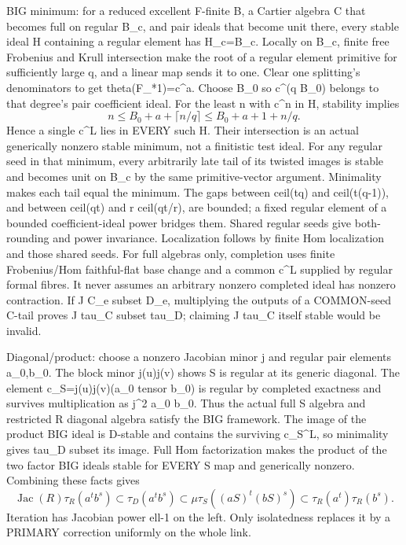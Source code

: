 \documentclass[11pt]{article}
\begin{document}
BIG minimum: for a reduced excellent F-finite B, a Cartier algebra C that becomes full on regular B\_c, and pair ideals that become unit there, every stable ideal H containing a regular element has H\_c=B\_c. Locally on B\_c, finite free Frobenius and Krull intersection make the root of a regular element primitive for sufficiently large q, and a linear map sends it to one. Clear one splitting's denominators to get theta(F\_*1)=c\textasciicircum{}a. Choose B\_0 so c\textasciicircum{}(q B\_0) belongs to that degree's pair coefficient ideal. For the least n with c\textasciicircum{}n in H, stability implies
\[
 n\le B_0+a+\lceil n/q\rceil\le B_0+a+1+n/q.
\]
Hence a single c\textasciicircum{}L lies in EVERY such H. Their intersection is an actual generically nonzero stable minimum, not a finitistic test ideal. For any regular seed in that minimum, every arbitrarily late tail of its twisted images is stable and becomes unit on B\_c by the same primitive-vector argument. Minimality makes each tail equal the minimum. The gaps between ceil(tq) and ceil(t(q-1)), and between ceil(qt) and r ceil(qt/r), are bounded; a fixed regular element of a bounded coefficient-ideal power bridges them. Shared regular seeds give both-rounding and power invariance. Localization follows by finite Hom localization and those shared seeds. For full algebras only, completion uses finite Frobenius/Hom faithful-flat base change and a common c\textasciicircum{}L supplied by regular formal fibres. It never assumes an arbitrary nonzero completed ideal has nonzero contraction. If J C\_e subset D\_e, multiplying the outputs of a COMMON-seed C-tail proves J tau\_C subset tau\_D; claiming J tau\_C itself stable would be invalid.

Diagonal/product: choose a nonzero Jacobian minor j and regular pair elements a\_0,b\_0. The block minor j(u)j(v) shows S is regular at its generic diagonal. The element c\_S=j(u)j(v)(a\_0 tensor b\_0) is regular by completed exactness and survives multiplication as j\textasciicircum{}2 a\_0 b\_0. Thus the actual full S algebra and restricted R diagonal algebra satisfy the BIG framework. The image of the product BIG ideal is D-stable and contains the surviving c\_S\textasciicircum{}L, so minimality gives tau\_D subset its image. Full Hom factorization makes the product of the two factor BIG ideals stable for EVERY S map and generically nonzero. Combining these facts gives
\[
 \operatorname{Jac}(R)\tau_R(a^t b^s)
 \subset\tau_D(a^t b^s)
 \subset\mu\tau_S((aS)^t(bS)^s)
 \subset\tau_R(a^t)\tau_R(b^s).
\]
Iteration has Jacobian power ell-1 on the left. Only isolatedness replaces it by a PRIMARY correction uniformly on the whole link.
\end{document}
